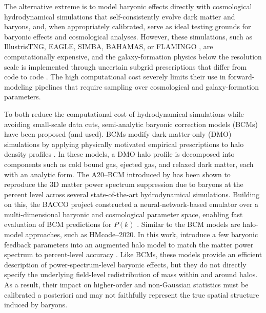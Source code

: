 \documentclass[linenumbers,trackchanges, twocolumn]{aastex701}
\begin{document}
The alternative extreme is to model baryonic effects directly with cosmological hydrodynamical simulations that self-consistently evolve dark matter and baryons, and, when appropriately calibrated, serve as ideal testing grounds for baryonic effects and cosmological analyses. However, these simulations, such as IllustrisTNG, EAGLE, SIMBA, BAHAMAS, or FLAMINGO \citep[e.g.][]{Vogelsberger2014,Schaye2015,Pillepich2018,Dave2019,Schaye2023}, are computationally expensive, and the galaxy-formation physics below the resolution scale is implemented through uncertain subgrid prescriptions that differ from code to code \citep{vanDaalen2014,Vogelsberger2020, villaescusa}. The high computational cost severely limits their use in forward-modeling pipelines that require sampling over cosmological and galaxy-formation parameters.

To both reduce the computational cost of hydrodynamical simulations while avoiding small-scale data cuts, semi-analytic baryonic correction models (BCMs) have been proposed (and used). BCMs modify dark-matter-only (DMO) simulations by applying physically motivated empirical prescriptions to halo density profiles \citep{SchneiderBridle2010,SchneiderTeyssier2015,Schneider2019,Arico2020}. In these models, a DMO halo profile is decomposed into components such as cold bound gas, ejected gas, and relaxed dark matter, each with an analytic form. The A20--BCM introduced by \citet{Arico2020} has been shown to reproduce the 3D matter power spectrum suppression due to baryons at the percent level across several state-of-the-art hydrodynamical simulations. Building on this, the BACCO project constructed a neural-network-based emulator over a multi-dimensional baryonic and cosmological parameter space, enabling fast evaluation of BCM predictions for $P(k)$ \citep{Arico2021b}. Similar to the BCM models are halo-model approaches, such as HMcode--2020. In this work, \cite{} introduce a few baryonic feedback parameters into an augmented halo model to match the matter power spectrum to percent-level accuracy \citep{Mead2021}. Like BCMs, these models provide an efficient description of power-spectrum-level baryonic effects, but they do not directly specify the underlying field-level redistribution of mass within and around halos. As a result, their impact on higher-order and non-Gaussian statistics must be calibrated a posteriori and may not faithfully represent the true spatial structure induced by baryons. 
\end{document}
